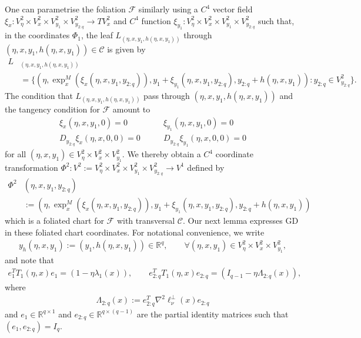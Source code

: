 \documentclass{article}
\newcommand{\RB}{\mathbb{R}}
\newcommand{\FC}{\mathcal{F}}
\newcommand{\CC}{\mathcal{C}}
\newcommand{\GD}{\mathrm{GD}}
\theoremstyle{plain}
\theoremstyle{definition}
\theoremstyle{remark}
\begin{document}
One can parametrise the foliation $\FC$ similarly using a $C^4$ vector field $\xi_x:V^2_{\eta}\times V^2_x\times V^2_{y_1}\times V^2_{y_{2:q}}\rightarrow TV^2_x$ and $C^4$ function $\xi_{y_1}:V^2_{\eta}\times V^2_x\times V^2_{y_1}\times V^2_{y_{2:q}}$ such that, in the coordinates $\Phi_1$, the leaf $L_{(\eta,x,y_1,h(\eta,x,y_1))}$ through $(\eta,x,y_1,h(\eta,x,y_1))\in \CC$ is given by
\begin{align}
    L&_{(\eta,x,y_1,h(\eta,x,y_1))} \\&= \{(\eta,\exp^M_x(\xi_x(\eta,x,y_1,y_{2:q})),y_1 + \xi_{y_1}(\eta,x,y_1,y_{2:q}),y_{2:q} + h(\eta,x,y_1)):y_{2:q}\in V^2_{y_{2:q}}\}.
\end{align}
The condition that $L_{(\eta,x,y_1,h(\eta,x,y_1))}$ pass through $(\eta,x,y_1,h(\eta,x,y_1))$ and the tangency condition for $\FC$ amount to
\begin{align}\label{eq:xi}
    \xi_x(\eta,x,y_1,0)= 0 &\qquad \xi_{y_1}(\eta,x,y_1,0)= 0\\ D_{y_{2:q}}\xi_x(\eta,x,0,0)= 0 & \qquad D_{y_{2:q}}\xi_{y_1}(\eta,x,0,0) = 0
\end{align}
for all $(\eta,x,y_1)\in V^2_{\eta}\times V^2_x\times V^2_{y_1}$. We thereby obtain a $C^4$ coordinate transformation $\Phi^2:V^2:=V^2_{\eta}\times V^2_x\times V^2_{y_1}\times V^2_{y_{2:q}}\rightarrow V^1$ defined by
\begin{align}
    \Phi^2&(\eta,x,y_1,y_{2:q})\\&:=(\eta,\exp^M_x(\xi_x(\eta,x,y_1,y_{2:q})),y_1 + \xi_{y_1}(\eta,x,y_1,y_{2:q}),y_{2:q} + h(\eta,x,y_1))
\end{align}
which is a foliated chart for $\FC$ with transversal $\CC$. Our next lemma expresses $\GD$ in these foliated chart coordinates. For notational convenience, we write
\begin{align}
    y_h(\eta,x,y_1):=(y_1,h(\eta,x,y_1))\in\RB^q,\qquad \forall (\eta,x,y_1)\in V^2_{\eta}\times V^2_x\times V^2_{y_1},
\end{align}
and note that
\begin{align}
    e_1^T T_1(\eta,x)e_1 = (1-\eta\lambda_1(x)),\qquad e_{2:q}^T T_1(\eta,x)e_{2:q} = (I_{q-1}-\eta\Lambda_{2:q}(x)),
\end{align}
where
\begin{align}
    \Lambda_{2:q}(x):=e_{2:q}^T\nabla^2\ell^{\perp}_{\nu}(x)e_{2:q}
\end{align}
and $e_1\in\RB^{q\times 1}$ and $e_{2:q}\in\RB^{q\times(q-1)}$ are the partial identity matrices such that $(e_1,e_{2:q})= I_q$.
\end{document}
